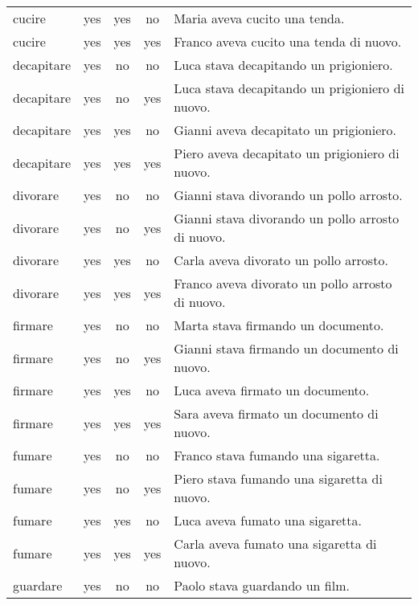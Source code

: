 \begin{longtable}{l|ccc|p{5cm}}
cucire         & yes  & yes        & no        & Maria aveva cucito una tenda.                       \\
cucire         & yes  & yes        & yes       & Franco aveva cucito una tenda di nuovo.             \\
decapitare     & yes  & no         & no        & Luca stava decapitando un prigioniero.              \\
decapitare     & yes  & no         & yes       & Luca stava decapitando un prigioniero di nuovo.     \\
decapitare     & yes  & yes        & no        & Gianni aveva decapitato un prigioniero.             \\
decapitare     & yes  & yes        & yes       & Piero aveva decapitato un prigioniero di nuovo.     \\
divorare       & yes  & no         & no        & Gianni stava divorando un pollo arrosto.            \\
divorare       & yes  & no         & yes       & Gianni stava divorando un pollo arrosto di nuovo.   \\
divorare       & yes  & yes        & no        & Carla aveva divorato un pollo arrosto.              \\
divorare       & yes  & yes        & yes       & Franco aveva divorato un pollo arrosto di nuovo.    \\
firmare        & yes  & no         & no        & Marta stava firmando un documento.                  \\
firmare        & yes  & no         & yes       & Gianni stava firmando un documento di nuovo.        \\
firmare        & yes  & yes        & no        & Luca aveva firmato un documento.                    \\
firmare        & yes  & yes        & yes       & Sara aveva firmato un documento di nuovo.           \\
fumare         & yes  & no         & no        & Franco stava fumando una sigaretta.                 \\
fumare         & yes  & no         & yes       & Piero stava fumando una sigaretta di nuovo.         \\
fumare         & yes  & yes        & no        & Luca aveva fumato una sigaretta.                    \\
fumare         & yes  & yes        & yes       & Carla aveva fumato una sigaretta di nuovo.          \\
guardare       & yes  & no         & no        & Paolo stava guardando un film.                      \\

\end{longtable}
